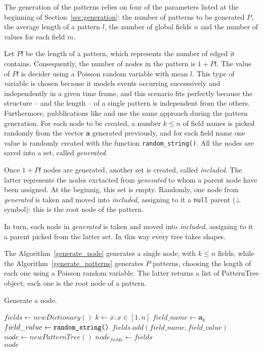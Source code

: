 \documentclass{acm_proc_article-sp-sigmod09}
\begin{document}
The generation of the patterns relies on four of the parameters listed at the beginning of Section~\ref{sec:generation}: the number of patterns to be generated $P$, the average length of a pattern $l$, the number of global fields $n$ and the number of values for each field $m$.

Let $Pl$ be the length of a pattern, which represents the number of edged it contains. Consequently, the number of nodes in the pattern is $1 + Pl$. The value of $Pl$ is decider using a Poisson random variable with mean $l$. This type of variable is chosen because it models events occurring successively and independently in a given time frame, and this scenario fits perfectly because the structure -- and the length -- of a single pattern is independent from the others. Furthermore, pubblications like \cite{agrawal1994fast} and \cite{ivancsy2006time} use the same approach during the pattern generation. For each node to be created, a number $k \le n$ of field names is picked randomly from the vector $\boldsymbol{a}$ generated previously, and for each field name one value is randomly created with the function \texttt{random\_string()}. All the nodes are saved into a set, called \emph{generated}.

Once $1 + Pl$ nodes are generated, another set is created, called \emph{included}. The latter represents the nodes exctacted from \emph{generated} to whom a parent node have been assigned. At the beginnig, this set is empty. Randomly, one node from \emph{generated} is taken and moved into \emph{included}, assigning to it a \texttt{null} parent ($\bot$ symbol): this is the root node of the pattern. 

In turn, each node in \emph{generated} is taken and moved into \emph{included}, assigning to it a parent picked from the latter set. In this way every tree takes shapes.

The Algorithm~\ref{generate_node} generates a single node, with $k \le n$ fields, while the Algorithm~\ref{generate_patterns} generates $P$ patterns, choosing the length of each one using a Poisson random variable. The latter returns a list of PatternTree object, each one is the root node of a pattern.

\begin{algorithm}
\caption{Generate a node.}
\label{generate_node}
\begin{algorithmic}[1]
\State $fields \gets new Dictionary()$
	\State $k \gets x : x \in [1, n]$
	\State $field\_name \gets \boldsymbol{a}_k$
	\State $field\_value \gets \text{\texttt{random\_string()}}$
	\State $fields.add(field\_name, field\_value)$
\EndFor
\State $node \gets new PatternTree()$
\State $node_{fields} \gets fields$ \\
\Return $node$
\EndFunction
\end{algorithmic}
\end{algorithm}
\end{document}

